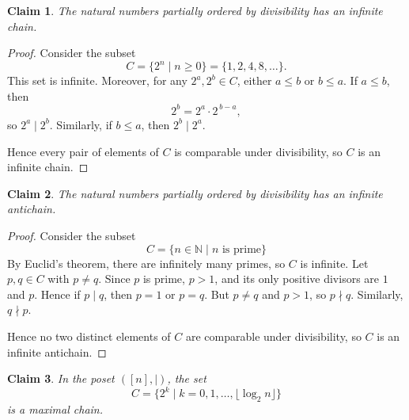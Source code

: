 \documentclass{article}
\newtheorem{claim}{Claim}
\begin{document}
\begin{claim}
    The natural numbers partially ordered by divisibility has an infinite chain.
\end{claim}

\begin{proof}
    Consider the subset
    \[
        C = \{2^n \mid n \ge 0\}
        = \{1,2,4,8,\dots\}.
    \]
    This set is infinite. Moreover, for any $2^a,2^b \in C$, either $a \le b$ or 
    $b \le a$. If $a \le b$, then
    \[
        2^b = 2^a \cdot 2^{\,b-a},
    \]
    so $2^a \mid 2^b$. Similarly, if $b \le a$, then $2^b \mid 2^a$.

    \medskip
    
    Hence every pair of elements of $C$ is comparable under divisibility, so $C$ is 
    an infinite chain.
\end{proof}

\begin{claim}
    The natural numbers partially ordered by divisibility has an infinite antichain.
\end{claim}

\begin{proof}
    Consider the subset
    \[
        C = \{ n \in \mathbb{N} \mid \text{$n$ is prime} \}
    \]
    By Euclid's theorem, there are infinitely many primes, so $C$ is infinite.
    Let $p,q \in C$ with $p \neq q$. Since $p$ is prime, $p > 1$, and its only 
    positive divisors are $1$ and $p$. Hence if $p \mid q$, then $p = 1$ or 
    $p = q$. But $p \neq q$ and $p > 1$, so $p \nmid q$. Similarly, $q \nmid p$.

    \medskip

    Hence no two distinct elements of $C$ are comparable under divisibility, so 
    $C$ is an infinite antichain.
\end{proof}

\begin{claim}
    In the poset $([n], \mid)$, the set
    \[
    C = \{ 2^k \mid k = 0,1,\dots,\lfloor \log_2 n \rfloor \}
    \]
    is a maximal chain.
\end{claim}
\end{document}
